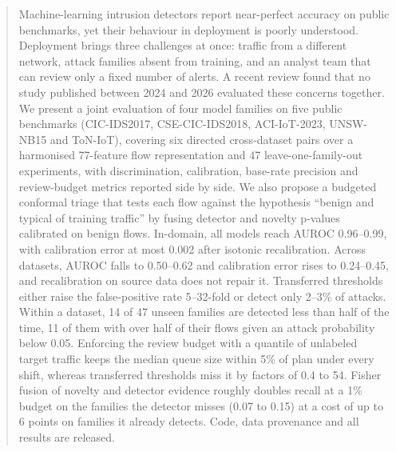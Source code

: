 \begin{abstract}
Machine-learning intrusion detectors report near-perfect accuracy on public benchmarks, yet their behaviour in deployment is poorly understood. Deployment brings three challenges at once: traffic from a different network, attack families absent from training, and an analyst team that can review only a fixed number of alerts. A recent review found that no study published between 2024 and 2026 evaluated these concerns together. We present a joint evaluation of four model families on five public benchmarks (CIC-IDS2017, CSE-CIC-IDS2018, ACI-IoT-2023, UNSW-NB15 and ToN-IoT), covering six directed cross-dataset pairs over a harmonised 77-feature flow representation and 47 leave-one-family-out experiments, with discrimination, calibration, base-rate precision and review-budget metrics reported side by side. We also propose a budgeted conformal triage that tests each flow against the hypothesis ``benign and typical of training traffic'' by fusing detector and novelty p-values calibrated on benign flows. In-domain, all models reach AUROC 0.96--0.99, with calibration error at most 0.002 after isotonic recalibration. Across datasets, AUROC falls to 0.50--0.62 and calibration error rises to 0.24--0.45, and recalibration on source data does not repair it. Transferred thresholds either raise the false-positive rate 5--32-fold or detect only 2--3\% of attacks. Within a dataset, 14 of 47 unseen families are detected less than half of the time, 11 of them with over half of their flows given an attack probability below 0.05. Enforcing the review budget with a quantile of unlabeled target traffic keeps the median queue size within 5\% of plan under every shift, whereas transferred thresholds miss it by factors of 0.4 to 54. Fisher fusion of novelty and detector evidence roughly doubles recall at a 1\% budget on the families the detector misses (0.07 to 0.15) at a cost of up to 6 points on families it already detects. Code, data provenance and all results are released.
\end{abstract}
